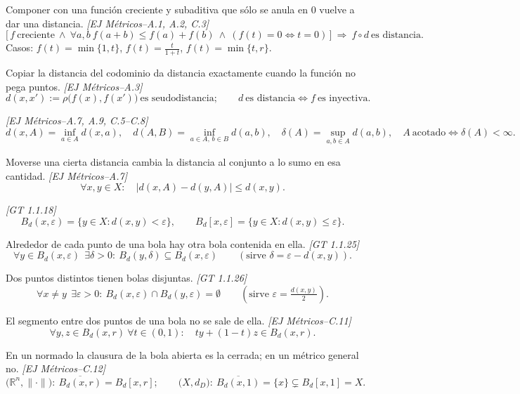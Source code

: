 \documentclass[11pt,a4paper]{article}
\theoremstyle{definition}
\theoremstyle{plain}
\newcommand{\fnt}[1]{{\normalfont\small\itshape\color{gray!150!black}[#1]}}
\newcommand{\R}{\mathbb{R}}
\newcommand{\cl}[1]{\overline{#1}}
\newcommand{\Bola}[2]{B_d(#1,#2)}
\newcommand{\Bolac}[2]{B_d[#1,#2]}
\newcommand{\norm}[1]{\lVert #1 \rVert}
\begin{document}
\begin{itemize}[leftmargin=1.3em,itemsep=3pt]
 Componer con una función creciente y subaditiva que sólo se anula en $0$ vuelve a dar una distancia. \fnt{EJ Métricos--A.1, A.2, C.3}
\[ \big[\,f\ \text{creciente}\ \wedge\ \forall a,b\ f(a+b)\le f(a)+f(b)\ \wedge\ (f(t)=0\Leftrightarrow t=0)\,\big]\ \Rightarrow\ f\circ d\ \text{es distancia}. \]
Casos: $f(t)=\min\{1,t\}$, $f(t)=\frac{t}{1+t}$, $f(t)=\min\{t,r\}$.

 Copiar la distancia del codominio da distancia exactamente cuando la función no pega puntos. \fnt{EJ Métricos--A.3}
\[ d(x,x'):=\rho\big(f(x),f(x')\big)\ \text{es seudodistancia};\qquad d\ \text{es distancia}\iff f\ \text{es inyectiva}. \]

 \fnt{EJ Métricos--A.7, A.9, C.5--C.8}
\[ d(x,A)=\inf_{a\in A}d(x,a),\quad d(A,B)=\inf_{a\in A,\,b\in B}d(a,b),\quad \delta(A)=\sup_{a,b\in A}d(a,b),\quad A\ \text{acotado}\iff \delta(A)<\infty. \]

 Moverse una cierta distancia cambia la distancia al conjunto a lo sumo en esa cantidad. \fnt{EJ Métricos--A.7}
\[ \forall x,y\in X:\quad \big|d(x,A)-d(y,A)\big|\le d(x,y). \]

 \fnt{GT 1.1.18}
\[ \Bola{x}{\varepsilon}=\{y\in X: d(x,y)<\varepsilon\},\qquad \Bolac{x}{\varepsilon}=\{y\in X: d(x,y)\le\varepsilon\}. \]

 Alrededor de cada punto de una bola hay otra bola contenida en ella. \fnt{GT 1.1.25}
\[ \forall y\in \Bola{x}{\varepsilon}\ \ \exists\delta>0:\ \Bola{y}{\delta}\subseteq \Bola{x}{\varepsilon}\qquad(\text{sirve } \delta=\varepsilon-d(x,y)). \]

 Dos puntos distintos tienen bolas disjuntas. \fnt{GT 1.1.26}
\[ \forall x\ne y\ \ \exists\varepsilon>0:\ \Bola{x}{\varepsilon}\cap\Bola{y}{\varepsilon}=\emptyset\qquad(\text{sirve }\varepsilon=\tfrac{d(x,y)}2). \]

 El segmento entre dos puntos de una bola no se sale de ella. \fnt{EJ Métricos--C.11}
\[ \forall y,z\in \Bola{x}{r}\ \forall t\in(0,1):\quad ty+(1-t)z\in \Bola{x}{r}. \]

 En un normado la clausura de la bola abierta es la cerrada; en un métrico general no. \fnt{EJ Métricos--C.12}
\[ \big(\R^n,\norm{\cdot}\big):\ \cl{\Bola{x}{r}}=\Bolac{x}{r};\qquad
\big(X,d_D\big):\ \cl{\Bola{x}{1}}=\{x\}\subsetneq \Bolac{x}{1}=X. \]


\end{itemize}
\end{document}
